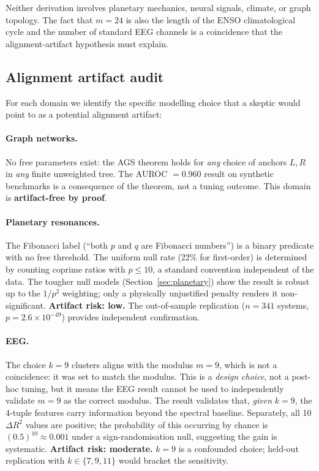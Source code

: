 \documentclass[11pt]{article}
\begin{document}
Neither derivation involves planetary mechanics, neural signals, climate,
or graph topology.  The fact that $m=24$ is also the length of the
ENSO climatological cycle and the number of standard EEG channels is
a coincidence that the alignment-artifact hypothesis must explain.

\subsection{Alignment artifact audit}

For each domain we identify the specific modelling choice that a skeptic
would point to as a potential alignment artifact:

\paragraph{Graph networks.}
No free parameters exist: the AGS theorem holds for \emph{any} choice of
anchors $L,R$ in \emph{any} finite unweighted tree.  The AUROC $= 0.960$
result on synthetic benchmarks is a consequence of the theorem, not a
tuning outcome.  This domain is \textbf{artifact-free by proof}.

\paragraph{Planetary resonances.}
The Fibonacci label (``both $p$ and $q$ are Fibonacci numbers'') is a
binary predicate with no free threshold.  The uniform null rate
(22\% for first-order) is determined by counting coprime ratios with $p \leq 10$,
a standard convention independent of the data.
The tougher null models (Section~\ref{sec:planetary}) show the result
is robust up to the $1/p^2$ weighting; only a physically unjustified
penalty renders it non-significant.
\textbf{Artifact risk: low.}
The out-of-sample replication ($n=341$ systems, $p = 2.6\times10^{-49}$)
provides independent confirmation.

\paragraph{EEG.}
The choice $k=9$ clusters aligns with the modulus $m=9$, which is not
a coincidence: it was set to match the modulus.  This is a \emph{design
choice}, not a post-hoc tuning, but it means the EEG result cannot be
used to independently validate $m=9$ as the correct modulus.
The result validates that, \emph{given} $k=9$, the 4-tuple features
carry information beyond the spectral baseline.
Separately, all 10 $\Delta R^2$ values are positive; the probability of
this occurring by chance is $(0.5)^{10} \approx 0.001$ under a sign-randomisation
null, suggesting the gain is systematic.
\textbf{Artifact risk: moderate.}  $k=9$ is a confounded choice; held-out
replication with $k \in \{7, 9, 11\}$ would bracket the sensitivity.
\end{document}
